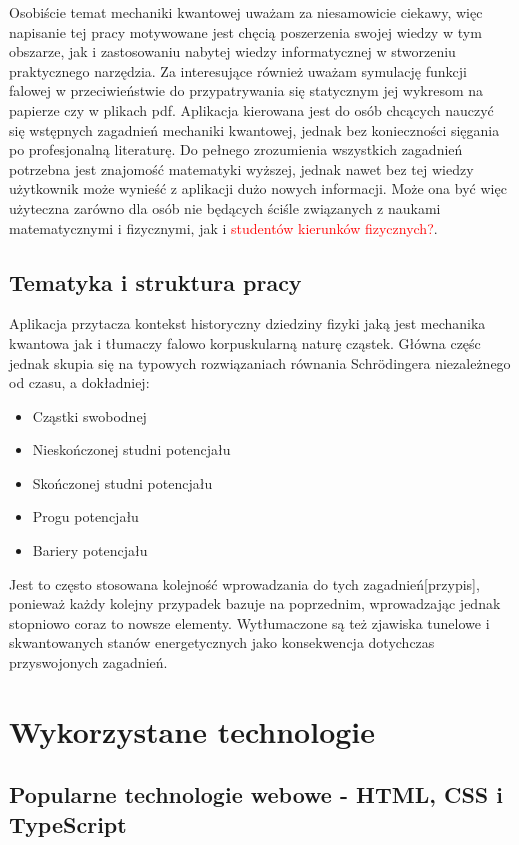 \documentclass{SGGW-thesis}
\begin{document}
	Osobiście temat mechaniki kwantowej uważam za niesamowicie ciekawy, więc napisanie tej pracy motywowane jest chęcią poszerzenia swojej wiedzy w tym obszarze, jak i zastosowaniu nabytej wiedzy informatycznej w stworzeniu praktycznego narzędzia. Za interesujące również uważam symulację funkcji falowej w przeciwieństwie do przypatrywania się statycznym jej wykresom na papierze czy w plikach pdf. Aplikacja kierowana jest do osób chcących nauczyć się wstępnych zagadnień mechaniki kwantowej, jednak bez konieczności sięgania po profesjonalną literaturę. Do pełnego zrozumienia wszystkich zagadnień potrzebna jest znajomość matematyki wyższej, jednak nawet bez tej wiedzy użytkownik może wynieść z aplikacji dużo nowych informacji. Może ona być więc użyteczna zarówno dla osób nie będących ściśle związanych z naukami matematycznymi i fizycznymi, jak i \textcolor{red}{studentów kierunków fizycznych?}.
	\section{Tematyka i struktura pracy}
	Aplikacja przytacza kontekst historyczny dziedziny fizyki jaką jest mechanika kwantowa jak i tłumaczy falowo korpuskularną naturę cząstek. Główna częśc jednak skupia się na typowych rozwiązaniach równania Schrödingera niezależnego od czasu, a dokładniej:
	\begin{itemize}
	\item Cząstki swobodnej
	\item Nieskończonej studni potencjału
	\item Skończonej studni potencjału
	\item Progu potencjału
	\item Bariery potencjału
	\end{itemize}
	
	Jest to często stosowana kolejność wprowadzania do tych zagadnień[przypis], ponieważ każdy kolejny przypadek bazuje na poprzednim, wprowadzając jednak stopniowo coraz to nowsze elementy. Wytłumaczone są też zjawiska tunelowe i skwantowanych stanów energetycznych jako konsekwencja dotychczas przyswojonych zagadnień.
	
	
\chapter{Wykorzystane technologie}
	\section{Popularne technologie webowe - HTML, CSS i TypeScript}
\end{document}
